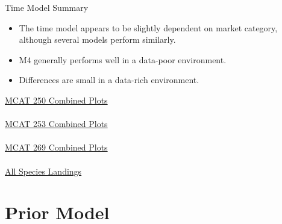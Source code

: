 \documentclass[ xcolor = pdftex, dvipsnames, table ]{beamer}
\begin{document}
%
\begin{frame}{Time Model Summary}	
        \begin{minipage}{0.49\textwidth}
	\begin{itemize}
	\item The time model appears to be slightly dependent on market category, although several models perform similarly. 
	\item M4 generally performs well in a data-poor environment.
	\item Differences are small in a data-rich environment.
	\end{itemize}
	\end{minipage}
        \begin{minipage}{0.49\textwidth}
	\begin{center}
	\href{https://github.com/gasduster99/sppComp/tree/master/try1/postSSC/25019781982M2M3M4}{MCAT 250 Combined Plots}\\$~$\\
	\href{https://github.com/gasduster99/sppComp/tree/master/try1/postSSC/25319781982M4M5M6}{MCAT 253 Combined Plots}\\$~$\\
	\href{https://github.com/gasduster99/sppComp/tree/master/try1/postSSC/26919781982M4M5M6}{MCAT 269 Combined Plots}\\$~$\\
	\href{https://github.com/gasduster99/sppComp/tree/master/try1/postSSC/landDiagnostics/M2M3M4M5M6}{All Species Landings}
	\end{center}
	\end{minipage}
\end{frame}



%
%

%
\section{Prior Model}
\end{document}
